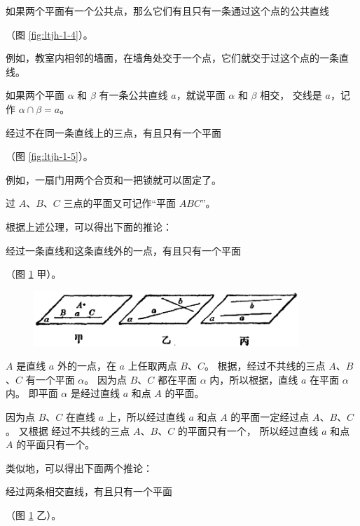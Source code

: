 \begin{gongli}[公理2][gl:pm-2]
    如果两个平面有一个公共点，那么它们有且只有一条通过这个点的公共直线
\end{gongli}（图 \ref{fig:ltjh-1-4}）。


例如，教室内相邻的墙面，在墙角处交于一个点，它们就交于过这个点的一条直线。

如果两个平面 $\alpha$ 和 $\beta$ 有一条公共直线 $a$，就说平面 $\alpha$ 和 $\beta$ 相交，
交线是 $a$，记作 $\alpha \cap \beta = a$。

\begin{gongli}[公理3][gl:pm-3]
    经过不在同一条直线上的三点，有且只有一个平面
\end{gongli}（图 \ref{fig:ltjh-1-5}）。

例如，一扇门用两个合页和一把锁就可以固定了。

过 $A$、$B$、$C$ 三点的平面又可记作“平面 $ABC$”。

根据上述公理，可以得出下面的推论：

\begin{tuilun}[推论1][tl:pm-1] %
    经过一条直线和这条直线外的一点，有且只有一个平面
\end{tuilun}（图 \ref{fig:ltjh-1-6} 甲）。

\begin{figure}[htbp]
    \centering
    \includegraphics[width=10cm]{../pic/ltjh-ch1-06.png}
    \caption{}\label{fig:ltjh-1-6}
\end{figure}

$A$ 是直线 $a$ 外的一点，在 $a$ 上任取两点 $B$、$C$。
根据，经过不共线的三点 $A$、$B$、$C$ 有一个平面 $\alpha$。
因为点 $B$、$C$ 都在平面 $\alpha$ 内，所以根据，直线 $a$ 在平面 $\alpha$ 内。
即平面 $\alpha$ 是经过直线 $a$ 和点 $A$ 的平面。

因为点 $B$、$C$ 在直线 $a$ 上，所以经过直线 $a$ 和点 $A$ 的平面一定经过点 $A$、$B$、$C$。
又根据 经过不共线的三点 $A$、$B$、$C$ 的平面只有一个，
所以经过直线 $a$ 和点 $A$ 的平面只有一个。

类似地，可以得出下面两个推论：

\begin{tuilun}[推论2][tl:pm-2]
    经过两条相交直线，有且只有一个平面
\end{tuilun}（图 \ref{fig:ltjh-1-6} 乙）。

